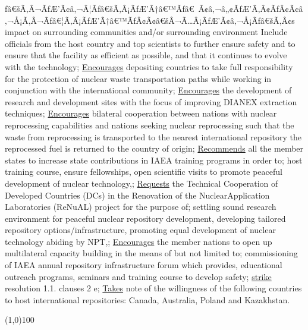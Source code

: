 \documentclass{article}
\begin{document}
\begin{outline}[enumerate]
ƒâ€šÃ‚Â¬ÃƒÆ’Ã¢â‚¬Â¦Ãƒâ€šÃ‚Â¡ÃƒÆ’Ã†â€™Ãƒâ€ Ã¢â‚¬â„¢ÃƒÆ’Ã‚Â¢ÃƒÂ¢Ã¢â‚¬Å¡Ã‚Â¬Ãƒâ€¦Ã‚Â¡ÃƒÆ’Ã†â€™ÃƒÂ¢Ã¢â€šÂ¬Ã…Â¡ÃƒÆ’Ã¢â‚¬Å¡Ãƒâ€šÃ‚Â¢s impact on surrounding communities and/or surrounding environment
\2 Include officials from the host country and top scientists to further ensure safety and to ensure that the facility as efficient as possible, and that it continues to evolve with the technology; 
\1 \underline{Encourages} depositing countries to take full responsibility for the protection of nuclear waste transportation paths while working in conjunction with the international community; 
\1 \underline{Encourages} the development of research and development sites with the focus of improving DIANEX extraction techniques; 
\1 \underline{Encourages} bilateral cooperation between nations with nuclear reprocessing capabilities and nations seeking nuclear reprocessing such that
\2 the waste from reprocessing is transported to the nearest international repository
\2 the reprocessed fuel is returned to the country of origin; 
\1 \underline{Recommends} all the member states to increase state contributions in IAEA training programs in order to;
\2 host training course,
\2 ensure fellowships,
\2 open scientific visits to promote peaceful development of nuclear technology,; 
\1 \underline{Requests} the Technical Cooperation of Developed Countries (DCs) in the Renovation of the NuclearApplication Laboratories (ReNuAL) project for the purpose of;
\2 settling sound research environment for peaceful nuclear repository development,
\2 developing tailored repository options/infrastructure,
\2 promoting equal development of nuclear technology abiding by NPT,; 
\1 \underline{Encourages} the member nations to open up multilateral capacity building in the means of but not limited to;
\2 commissioning of IAEA annual repository infrastructure forum which provides,
\3 educational outreach programs, seminars and training course to develop safety; 
\1 \underline{strike} resolution 1.1. clauses 2 e; 
\1 \underline{Takes} note of the willingness of the following countries to host international repositories: Canada, Australia, Poland and Kazakhstan.
\end{outline}

\linethickness{.2mm}
\begin{center}
\line(1,0){100}
\end{center}
\end{document}
